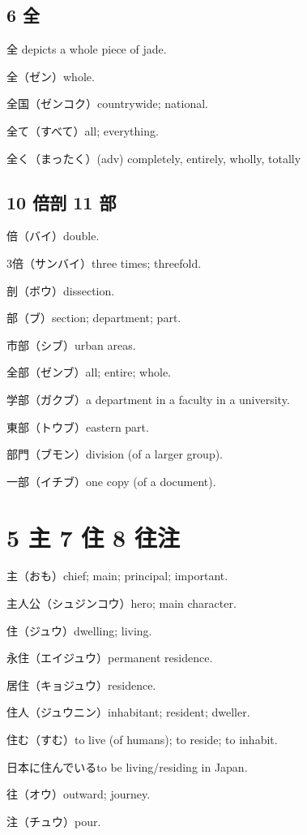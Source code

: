 \subsection{6 全}

全 depicts a whole piece of jade.

全（ゼン）whole.

全国（ゼンコク）countrywide; national.

全て（すべて）all; everything.

全く（まったく）(adv) completely, entirely, wholly, totally

\subsection{10 倍剖 11 部}

倍（バイ）double.

3倍（サンバイ）three times; threefold.

剖（ボウ）dissection.

部（ブ）section; department; part.

市部（シブ）urban areas.

全部（ゼンブ）all; entire; whole.

学部（ガクブ）a department in a faculty in a university.

東部（トウブ）eastern part.

部門（ブモン）division (of a larger group).

一部（イチブ）one copy (of a document).

\section{5 主 7 住 8 往注}

主（おも）chief; main; principal; important.

主人公（シュジンコウ）hero; main character.

住（ジュウ）dwelling; living.

永住（エイジュウ）permanent residence.

居住（キョジュウ）residence.

住人（ジュウニン）inhabitant; resident; dweller.

住む（すむ）to live (of humans); to reside; to inhabit.

日本に住んでいるto be living/residing in Japan.

往（オウ）outward; journey.

注（チュウ）pour.

